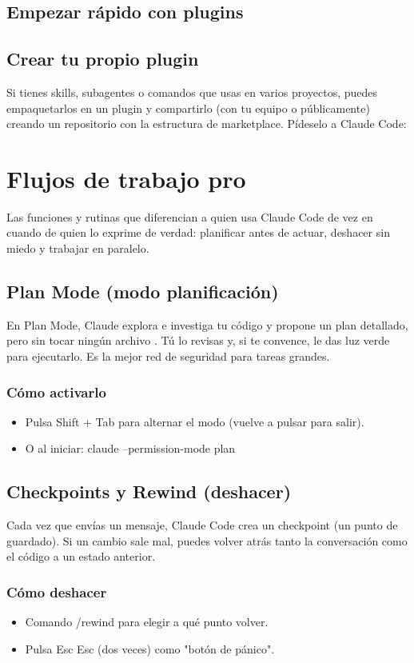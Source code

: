 \documentclass[11pt,a4paper]{book}
\begin{document}
\section{Empezar rápido con plugins}
\section{Crear tu propio plugin}
Si tienes skills, subagentes o comandos que usas en varios proyectos, puedes empaquetarlos en un plugin y compartirlo (con tu equipo o públicamente) creando un repositorio con la estructura de marketplace. Pídeselo a Claude Code:

\chapter{Flujos de trabajo pro}
Las funciones y rutinas que diferencian a quien usa Claude Code de vez en cuando de quien lo exprime de verdad: planificar antes de actuar, deshacer sin miedo y trabajar en paralelo.

\section{Plan Mode (modo planificación)}
En Plan Mode, Claude explora e investiga tu código y propone un plan detallado, pero sin tocar ningún archivo . Tú lo revisas y, si te convence, le das luz verde para ejecutarlo. Es la mejor red de seguridad para tareas grandes.

\subsection{Cómo activarlo}
\begin{itemize}\item Pulsa Shift + Tab para alternar el modo (vuelve a pulsar para salir).\end{itemize}
\begin{itemize}\item O al iniciar: claude --permission-mode plan\end{itemize}
\section{Checkpoints y Rewind (deshacer)}
Cada vez que envías un mensaje, Claude Code crea un checkpoint (un punto de guardado). Si un cambio sale mal, puedes volver atrás tanto la conversación como el código a un estado anterior.

\subsection{Cómo deshacer}
\begin{itemize}\item Comando /rewind para elegir a qué punto volver.\end{itemize}
\begin{itemize}\item Pulsa Esc Esc (dos veces) como "botón de pánico".\end{itemize}
\end{document}
